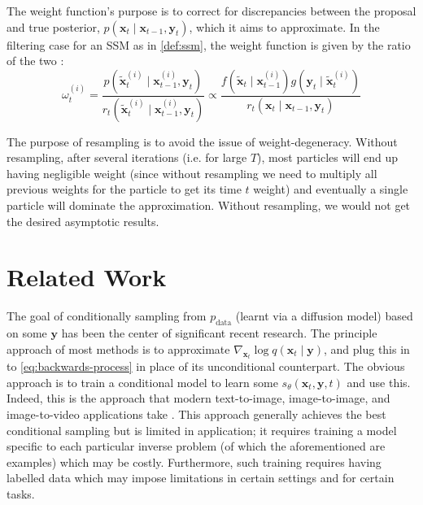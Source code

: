 \begin{remark}
    The weight function's purpose is to correct for discrepancies between the proposal and true
    posterior, $p(\mathbf{x}_t \mid \mathbf{x}_{t-1}, \mathbf{y}_t)$, which it aims to approximate. In the
    filtering case for an SSM as in \autoref{def:ssm}, the weight function is given by the ratio of the
    two \parencite{chopinIntroductionSequentialMonte2020}:
    \begin{equation}
        \omega_t^{(i)} = \frac{p(\tilde{\mathbf{x}}_t^{(i)} \mid \mathbf{x}_{t-1}^{(i)}, \mathbf{y}_t)}{r_t(\tilde{\mathbf{x}}_t^{(i)} \mid \mathbf{x}_{t-1}^{(i)}, \mathbf{y}_{t})}
        \propto \frac{f(\tilde{\mathbf{x}}_t \mid \mathbf{x}_{t-1}^{(i)})g(\mathbf{y}_t \mid \tilde{\mathbf{x}}_t^{(i)})}{r_t(\mathbf{x}_t \mid \mathbf{x}_{t-1}, \mathbf{y}_{t})} \label{eq:weight-func-gen}
    \end{equation}
\end{remark}

\begin{remark}[Resampling]
    The purpose of resampling is to avoid the issue of weight-degeneracy. Without resampling,
    after several iterations (i.e. for large $T$), most particles will end up having negligible
    weight (since without resampling we need to multiply all previous weights for the particle to
    get its time $t$ weight) and eventually a single particle will dominate the approximation.
    Without resampling, we would not get the desired asymptotic results.
\end{remark}

\section{Related Work} \label{sec:related-work}

The goal of conditionally sampling from $p_{\text{data}}$ (learnt via a diffusion model) based on
some $\mathbf{y}$ has been the center of significant recent research. The principle approach of most
methods is to approximate $\nabla_{\mathbf{x}_t}\log q(\mathbf{x}_t \mid \mathbf{y})$, and plug this
in to \autoref{eq:backwards-process} in place of its unconditional counterpart. The obvious approach is
to train a conditional model to learn some $s_{\theta}(\mathbf{x}_t, \mathbf{y}, t)$ and use this.
Indeed, this is the approach that modern text-to-image, image-to-image, and image-to-video
applications take \parencite{nicholGLIDEPhotorealisticImage2021,liDiffusionModelsImage2023,
sahariaPaletteImagetoImageDiffusion2021,sahariaPaletteImagetoImageDiffusion2021,
rombachHighResolutionImageSynthesis2021}. This approach generally achieves the best conditional
sampling but is limited in application; it requires training a model specific to each particular
inverse problem (of which the aforementioned are examples) which may be costly. Furthermore, such
training requires having labelled data which may impose limitations in certain settings and for
certain tasks.

